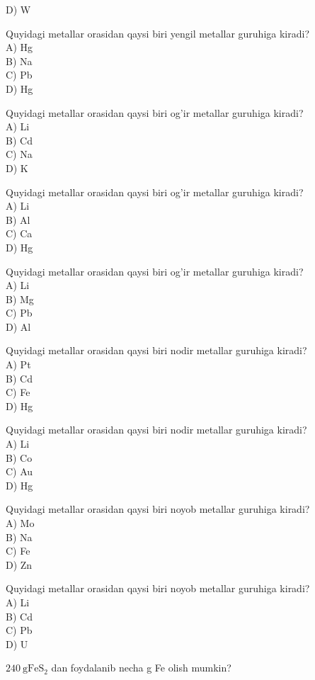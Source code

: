 D) W
  \item Quyidagi metallar orasidan qaysi biri yengil metallar guruhiga kiradi?\\
A) Hg\\
B) Na\\
C) Pb\\
D) Hg
  \item Quyidagi metallar orasidan qaysi biri og'ir metallar guruhiga kiradi?\\
A) Li\\
B) Cd\\
C) Na\\
D) K
  \item Quyidagi metallar orasidan qaysi biri og'ir metallar guruhiga kiradi?\\
A) Li\\
B) Al\\
C) Ca\\
D) Hg
  \item Quyidagi metallar orasidan qaysi biri og'ir metallar guruhiga kiradi?\\
A) Li\\
B) Mg\\
C) Pb\\
D) Al
  \item Quyidagi metallar orasidan qaysi biri nodir metallar guruhiga kiradi?\\
A) Pt\\
B) Cd\\
C) Fe\\
D) Hg
  \item Quyidagi metallar orasidan qaysi biri nodir metallar guruhiga kiradi?\\
A) Li\\
B) Co\\
C) Au\\
D) Hg
  \item Quyidagi metallar orasidan qaysi biri noyob metallar guruhiga kiradi?\\
A) Mo\\
B) Na\\
C) Fe\\
D) Zn
  \item Quyidagi metallar orasidan qaysi biri noyob metallar guruhiga kiradi?\\
A) Li\\
B) Cd\\
C) Pb\\
D) U
  \item $240 \mathrm{~g} \mathrm{FeS}_{2}$ dan foydalanib necha g Fe olish mumkin?\\
